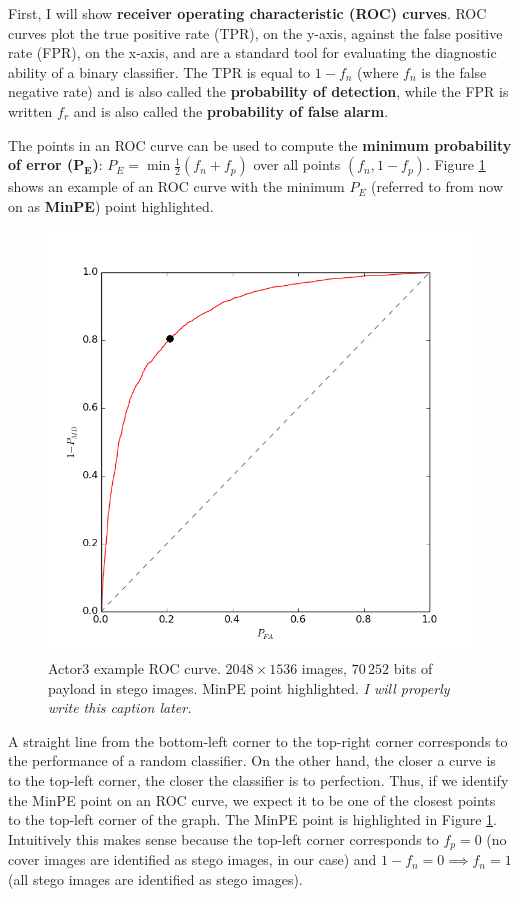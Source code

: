 \documentclass[11pt,a4paper,twoside,openright]{report}
\begin{document}
First, I will show \textbf{receiver operating characteristic (ROC) curves}. ROC curves plot the true positive rate (TPR), on the y-axis, against the false positive rate (FPR), on the x-axis, and are a standard tool for evaluating the diagnostic ability of a binary classifier. The TPR is equal to $1-f_n$ (where $f_n$ is the false negative rate) and is also called the \textbf{probability of detection}, while the FPR is written $f_r$ and is also called the \textbf{probability of false alarm}.

The points in an ROC curve can be used to compute the \textbf{minimum probability of error ($\bm{P_E}$)}: $P_E = \min{\frac{1}{2}(f_n+f_p)}$ over all points $(f_n, 1-f_p)$. Figure \ref{fig:actor3-roc-example} shows an example of an ROC curve with the minimum $P_E$ (referred to from now on as \textbf{MinPE}) point highlighted.

\begin{figure}[htbp]
	\begin{center}
		\includegraphics[width=0.5\linewidth]{actor3_size2048_70252b_roc.png}
		\caption{Actor3 example ROC curve. $2048\times1536$ images, $70\,252$ bits of payload in stego images. MinPE point highlighted. \textit{I will properly write this caption later.}}
		\label{fig:actor3-roc-example}
	\end{center}
\end{figure}

A straight line from the bottom-left corner to the top-right corner corresponds to the performance of a random classifier. On the other hand, the closer a curve is to the top-left corner, the closer the classifier is to perfection. Thus, if we identify the MinPE point on an ROC curve, we expect it to be one of the closest points to the top-left corner of the graph. The MinPE point is highlighted in Figure \ref{fig:actor3-roc-example}. Intuitively this makes sense because the top-left corner corresponds to $f_p = 0$ (no cover images are identified as stego images, in our case) and $1-f_n = 0 \implies f_n = 1$ (all stego images are identified as stego images).
\end{document}
